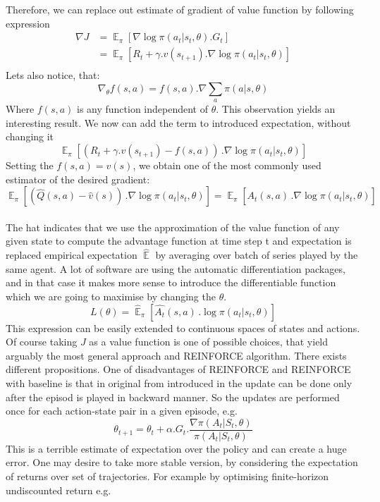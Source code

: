 \documentclass{article}
\DeclareMathOperator{\E}{\mathbb{E}}
\begin{document}
Therefore, we can replace out estimate of gradient of value function by following expression 
\begin{equation*}
    \begin{aligned}
    \nabla J
    &=\E_\pi \left[ \nabla \log \pi(a_t |s_t, \theta) .G_t \right]\\
    &=\E_\pi \left[ R_t +  \gamma .v(s_{t+1}) .\nabla \log \pi(a_t |s_t, \theta)  \right]\\
    \end{aligned}
\end{equation*}
Lets also notice, that:
$$\nabla_{\theta} f(s, a) = f(s, a) .\nabla \sum_a \pi(a |s, \theta)$$
Where $f(s, a)$ is any function independent of $\theta$. This observation yields an interesting result. We now can add the term to introduced expectation, without changing it
$$
\E_\pi \left[ ( R_t +  \gamma .v(s_{t+1}) -f(s, a))\, .\nabla \log \pi(a_t |s_t, \theta)  \right]
$$
Setting the $f(s, a) = v(s)$, we obtain one of the most commonly used estimator of the desired gradient:
$$
\E_\pi \left[ ( \hat{Q}(s, a) - \hat{v}(s))\, .\nabla \log \pi(a_t |s_t, \theta)  \right] = \E_\pi \left[\hat{A_t}(s, a)\, .\nabla \log \pi(a_t |s_t, \theta)  \right] 
$$
\\ 
The hat indicates that we use the approximation of the value function of any given state to compute the advantage function at time step t and expectation is replaced empirical expectation $\hat{\E}$ by averaging over batch of series played by the same agent. A lot of software are using the automatic differentiation packages, and in that case it makes more sense to introduce the differentiable function which we are going to maximise by changing the $\theta$.
$$
L(\theta) = \hat{\E}_\pi \left[\hat{A_t}(s, a)\, .\log \pi(a_t |s_t, \theta)  \right] 
$$
This expression can be easily extended to continuous spaces of states and actions. Of course taking $J$ as a value function is one of possible choices, that yield arguably the most general approach and REINFORCE algorithm. There exists different propositions. One of disadvantages of REINFORCE and REINFORCE with baseline is that in original from introduced in \cite{sutton2018reinforcement} the update can be done only after the episod is played in backward manner. So the updates are performed once for each action-state pair in a given episode, e.g.
$$
\theta_{t+1} = \theta_{t} + \alpha .G_t.\frac{\nabla \pi (A_t |S_t, \theta)}{\pi (A_t |S_t, \theta)}
$$
This is a terrible estimate of expectation over the policy and can create a huge error. One may desire to take more stable version, by considering the expectation of returns over set of trajectories. For example by optimising finite-horizon undiscounted return  e.g. 
\end{document}
